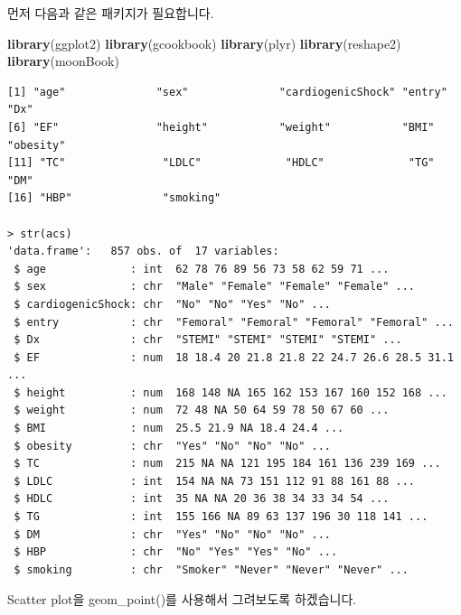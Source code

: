 \documentclass[10pt,]{krantz}
\makeatletter
\newenvironment{Shaded}{\begin{snugshade}}{\end{snugshade}}
\newcommand{\KeywordTok}[1]{\textcolor[rgb]{0.13,0.29,0.53}{\textbf{#1}}}
\newcommand{\DataTypeTok}[1]{\textcolor[rgb]{0.13,0.29,0.53}{#1}}
\newcommand{\StringTok}[1]{\textcolor[rgb]{0.31,0.60,0.02}{#1}}
\newcommand{\CommentTok}[1]{\textcolor[rgb]{0.56,0.35,0.01}{\textit{#1}}}
\newcommand{\OperatorTok}[1]{\textcolor[rgb]{0.81,0.36,0.00}{\textbf{#1}}}
\newcommand{\NormalTok}[1]{#1}
\newenvironment{kframe}{%
\medskip{}
\setlength{\fboxsep}{.8em}
 \def\at@end@of@kframe{}%
 \ifinner\ifhmode%
  \def\at@end@of@kframe{\end{minipage}}%
  \begin{minipage}{\columnwidth}%
 \fi\fi%
 \def\FrameCommand##1{\hskip\@totalleftmargin \hskip-\fboxsep
 \colorbox{shadecolor}{##1}\hskip-\fboxsep
     \hskip-\linewidth \hskip-\@totalleftmargin \hskip\columnwidth}%
 \MakeFramed {\advance\hsize-\width
   \@totalleftmargin\z@ \linewidth\hsize
   \@setminipage}}%
 {\par\unskip\endMakeFramed%
 \at@end@of@kframe}
\renewenvironment{Shaded}{\begin{kframe}}{\end{kframe}}
\theoremstyle{definition}
\theoremstyle{definition}
\theoremstyle{remark}
\makeatother
\begin{document}
먼저 다음과 같은 패키지가 필요합니다.

\begin{Shaded}
\begin{Highlighting}[]
\KeywordTok{library}\NormalTok{(ggplot2)}
\KeywordTok{library}\NormalTok{(gcookbook)}
\KeywordTok{library}\NormalTok{(plyr)}
\KeywordTok{library}\NormalTok{(reshape2)}
\KeywordTok{library}\NormalTok{(moonBook)}
\end{Highlighting}
\end{Shaded}

\begin{verbatim}
[1] "age"              "sex"              "cardiogenicShock" "entry"            "Dx"              
[6] "EF"               "height"           "weight"           "BMI"              "obesity"         
[11] "TC"               "LDLC"             "HDLC"             "TG"               "DM"              
[16] "HBP"              "smoking"   

> str(acs)
'data.frame':   857 obs. of  17 variables:
 $ age             : int  62 78 76 89 56 73 58 62 59 71 ...
 $ sex             : chr  "Male" "Female" "Female" "Female" ...
 $ cardiogenicShock: chr  "No" "No" "Yes" "No" ...
 $ entry           : chr  "Femoral" "Femoral" "Femoral" "Femoral" ...
 $ Dx              : chr  "STEMI" "STEMI" "STEMI" "STEMI" ...
 $ EF              : num  18 18.4 20 21.8 21.8 22 24.7 26.6 28.5 31.1 ...
 $ height          : num  168 148 NA 165 162 153 167 160 152 168 ...
 $ weight          : num  72 48 NA 50 64 59 78 50 67 60 ...
 $ BMI             : num  25.5 21.9 NA 18.4 24.4 ...
 $ obesity         : chr  "Yes" "No" "No" "No" ...
 $ TC              : num  215 NA NA 121 195 184 161 136 239 169 ...
 $ LDLC            : int  154 NA NA 73 151 112 91 88 161 88 ...
 $ HDLC            : int  35 NA NA 20 36 38 34 33 34 54 ...
 $ TG              : int  155 166 NA 89 63 137 196 30 118 141 ...
 $ DM              : chr  "Yes" "No" "No" "No" ...
 $ HBP             : chr  "No" "Yes" "Yes" "No" ...
 $ smoking         : chr  "Smoker" "Never" "Never" "Never" ...
\end{verbatim}

Scatter plot을 geom\_point()를 사용해서 그려보도록 하겠습니다.

\begin{Shaded}
\end{Shaded}
\end{document}
